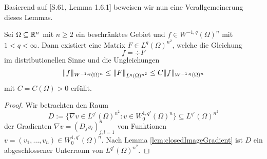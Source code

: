 Basierend auf \cite{sohr2001navier}[S.61, Lemma 1.6.1] beweisen wir nun eine Verallgemeinerung dieses Lemmas. 

\begin{lem}
  \label{lem:divRepresentation}
  Sei $\Omega \subseteq \mathbb{R}^n$ mit $n \geq 2$ ein beschränktes Gebiet und $f \in W^{-1,q}(\Omega)^n$ mit $1 < q < \infty$.
  Dann existiert eine Matrix $F \in L^q(\Omega)^{n^2}$, welche die Gleichung
  $$ f = \div F $$
  im distributionellen Sinne und die Ungleichungen
  $$
  \lVert  f  \rVert_{W^{-1,q}(\Omega)^n} 
  \leq \lVert  F  \rVert_{L^q(\Omega)^{n^2}} 
  \leq C \lVert  f  \rVert_{W^{-1,q}(\Omega)^n}
  $$
  mit $C = C(\Omega) > 0$ erfüllt.
\end{lem}

\begin{proof}
  Wir betrachten den Raum
  $$
  D := \{\nabla v \in L^{q'}(\Omega)^{n^2} \colon v \in W_0^{1,q'}(\Omega)^n\} \subseteq L^{q'}(\Omega)^{n^2}
  $$
  der Gradienten $\nabla v = (D_j v_l)_{j,l=1}^n$ von Funktionen $v = (v_1,\dots,v_n) \in W_0^{1,q'}(\Omega)^n$.
  Nach Lemma \ref{lem:closedImageGradient} ist $D$ ein abgeschlossener Unterraum von $L^{q'}(\Omega)^{n^2}$.


\end{proof}
